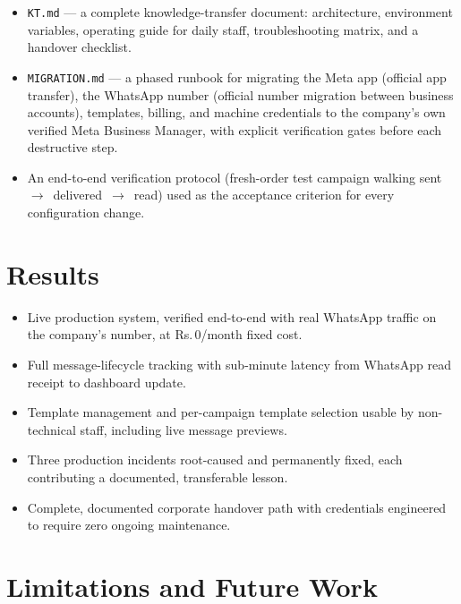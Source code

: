 \documentclass[11pt,a4paper]{article}
\newcommand{\rupee}{Rs.\,}
\begin{document}
\begin{itemize}[nosep]
  \item \texttt{KT.md} --- a complete knowledge-transfer document:
        architecture, environment variables, operating guide for daily
        staff, troubleshooting matrix, and a handover checklist.
  \item \texttt{MIGRATION.md} --- a phased runbook for migrating the Meta
        app (official app transfer), the WhatsApp number (official number
        migration between business accounts), templates, billing, and
        machine credentials to the company's own verified Meta Business
        Manager, with explicit verification gates before each destructive
        step.
  \item An end-to-end verification protocol (fresh-order test campaign
        walking sent~$\rightarrow$~delivered~$\rightarrow$~read) used as
        the acceptance criterion for every configuration change.
\end{itemize}

\section{Results}

\begin{itemize}[nosep]
  \item Live production system, verified end-to-end with real WhatsApp
        traffic on the company's number, at \rupee 0/month fixed cost.
  \item Full message-lifecycle tracking with sub-minute latency from
        WhatsApp read receipt to dashboard update.
  \item Template management and per-campaign template selection usable by
        non-technical staff, including live message previews.
  \item Three production incidents root-caused and permanently fixed, each
        contributing a documented, transferable lesson.
  \item Complete, documented corporate handover path with credentials
        engineered to require zero ongoing maintenance.
\end{itemize}

\section{Limitations and Future Work}
\end{document}
